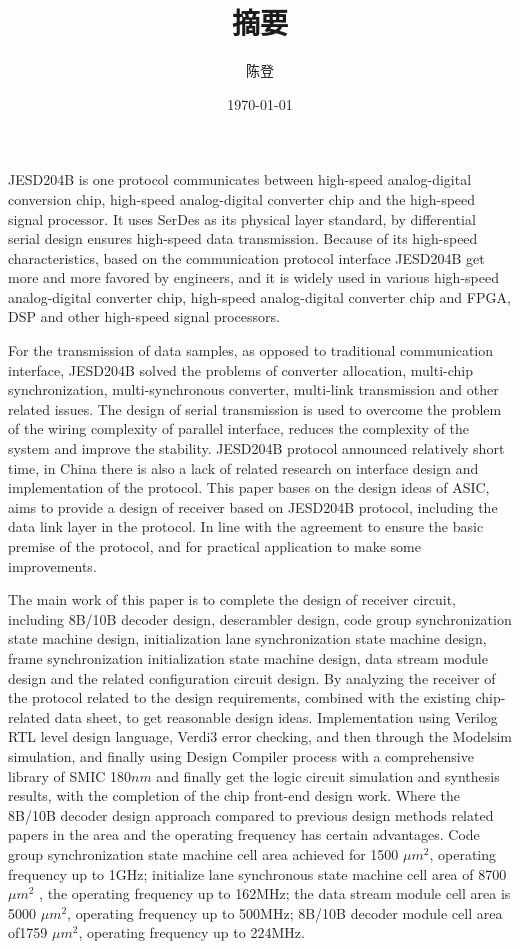 \documentclass[UTF8]{ctexart}
\title{摘要}
\author{陈登}
\date{\today}
\begin{document}
JESD204B is one protocol communicates between high-speed analog-digital conversion chip, high-speed analog-digital converter chip and the high-speed signal processor. It uses SerDes as its physical layer standard, by differential serial design ensures high-speed data transmission. Because of its high-speed characteristics, based on the communication protocol interface JESD204B get more and more favored by engineers, and it is widely used in various high-speed analog-digital converter chip, high-speed analog-digital converter chip and FPGA, DSP and other high-speed signal processors.

For the transmission of data samples, as opposed to traditional communication interface, JESD204B solved the problems of converter allocation, multi-chip synchronization, multi-synchronous converter, multi-link transmission and other related issues. The design of serial transmission is used to overcome the problem of the wiring complexity of parallel interface, reduces the complexity of the system and improve the stability. JESD204B protocol announced relatively short time, in China there is also a lack of related research on interface design and implementation of the protocol. This paper bases on the design ideas of ASIC, aims to provide a design of receiver based on JESD204B protocol, including the data link layer in the protocol. In line with the agreement to ensure the basic premise of the protocol, and for practical application to make some improvements.

The main work of this paper is to complete the design of receiver circuit, including 8B/10B decoder design, descrambler design, code group synchronization state machine design, initialization lane synchronization state machine design, frame synchronization initialization state machine design, data stream module design and the related configuration circuit design. By analyzing the receiver of the protocol related to the design requirements, combined with the existing chip-related data sheet, to get reasonable design ideas. Implementation using Verilog RTL level design language, Verdi3 error checking, and then through the Modelsim simulation, and finally using Design Compiler process with a comprehensive library of SMIC 180$nm$ and finally get the logic circuit simulation and synthesis results, with the completion of the chip front-end design work. Where the 8B/10B decoder design approach compared to previous design methods related papers in the area and the operating frequency has certain advantages. Code group synchronization state machine cell area achieved for 1500 $\mu m^2$, operating frequency up to 1GHz; initialize lane synchronous state machine cell area of ​​8700 $\mu m^2$ , the operating frequency up to 162MHz; the data stream module cell area is 5000 $\mu m^2$, operating frequency up to 500MHz; 8B/10B decoder module cell area of ​​1759 $\mu m^2$, operating frequency up to 224MHz.


\end{document}
